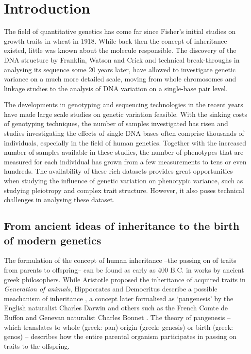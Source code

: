 \chapter{Introduction}
The field of quantitative genetics has come far since Fisher's initial studies on growth traits in wheat in 1918. While back then the concept of inheritance existed, little was known about the molecule responsible. The discovery of the DNA structure by Franklin, Watson and Crick and technical break-throughs in analysing its sequence some 20 years later, have allowed to investigate genetic variance on a much more detailed scale, moving from whole chromosomes and linkage studies to the analysis of DNA variation on a single-base pair level. 

The developments in genotyping and sequencing technologies in the recent years have made large scale studies on genetic variation feasible. With the sinking costs of genotyping techniques, the number of samples investigated has risen and studies investigating the effects of single DNA bases often comprise thousands of individuals, especially in the field of human genetics.  Together with the increased number of samples available in these studies, the number of phenotypes that are measured for each individual has grown from a few measurements to tens or even hundreds. The availability of these rich datasets provides great opportunities when studying the influence of genetic variation on phenotypic variance, such as studying pleiotropy and complex trait structure. However, it also poses technical challenges in analysing these dataset. 

\section{From ancient ideas of inheritance to the birth of modern genetics}
The formulation of the concept of human inheritance --the passing on of traits from parents to offspring-- can be found as early as 400 B.C. in works by ancient greek philosophers. While Aristotle proposed the inheritance of acquired traits in \textit{Generation of animals}, Hippocrates and Democritus describe a possible meachanism of inheritance \citep{Zirkle1935}, a concept later formalised as `pangenesis' by the English naturalist Charles Darwin \citep{Darwin1868} and others such as the French Comte de Buffon \citep{Buffon1749} and Genevan naturalist Charles Bonnet \citep{Bonnet1781}. The theory of pangenesis -- which translates to whole (greek: pan) origin (greek: genesis) or birth (greek: genos) -- describes how the entire parental organism participates in passing on traits to the offspring. 

